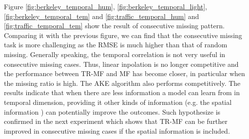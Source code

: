 Figure \ref{fig:berkeley_temporal_hum}, \ref{fig:berkeley_temporal_light}, \ref{fig:berkeley_temporal_tem} and \ref{fig:traffic_temporal_hum} and \ref{fig:traffic_temporal_tem} show the result of consecutive missing pattern. Comparing it with the previous figure, we can find that the consecutive missing task is more challenging as the RMSE is much higher than that of random missing.
Generally speaking, the temporal correlation is not very useful in consecutive missing cases. Thus, linear inpolation is no longer competitive and the performance between TR-MF and MF has become closer, in particular when the missing ratio is high. The AKE algorithm also performs competitively. The results indicate that when there are less information a model can learn from in temporal dimension, providing it other kinds of information (e.g. the spatial information ) can potentially improve the outcomes. Such hypothesize is confirmed in the next experiment which shows that TR-MF can be further improved in consecutive missing cases if the spatial information is included. 


